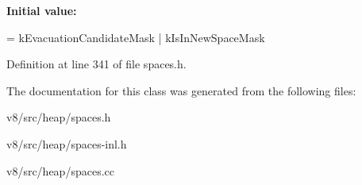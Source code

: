 {\bfseries Initial value\+:}
\begin{DoxyCode}
=
      kEvacuationCandidateMask | kIsInNewSpaceMask
\end{DoxyCode}


Definition at line 341 of file spaces.\+h.



The documentation for this class was generated from the following files\+:\begin{DoxyCompactItemize}
\item 
v8/src/heap/spaces.\+h\item 
v8/src/heap/spaces-\/inl.\+h\item 
v8/src/heap/spaces.\+cc\end{DoxyCompactItemize}

